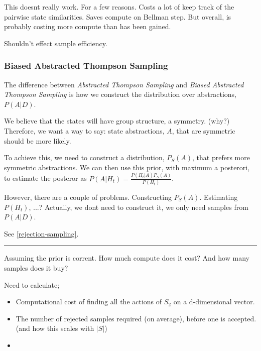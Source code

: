 
This doesnt really work. For a few reasons. Costs a lot of keep track of the pairwise state similarities.
Saves compute on Bellman step.
But overall, is probably costing more compute than has been gained.

Shouldn't effect sample efficiency.

\subsubsection{Biased Abstracted Thompson Sampling}

The difference between \textit{Abstracted Thompson Sampling} and \textit{Biased Abstracted Thompson Sampling}
is how we construct the distribution over abstractions, $P(A|D)$.

We believe that the states will have group structure, a symmetry. ({\color{red}why?})
Therefore, we want a way to say: state abstractions, $A$, that are symmetric should be more likely.

To achieve this, we need to construct a distribution, $P_S(A)$, that prefers more symmetric abstractions.
We can then use this prior, with maximum a posterori, to estimate the posteror as $P(A | H_t) = \frac{P(H_t | A)P_S(A)}{P(H_t)}$.

However, there are a couple of problems. Constructing $P_S(A)$. Estimating $P(H_t)$, ...?
Actually, we dont need to construct it, we only need samples from $P(A | D)$.

See \ref{rejection-sampling}.

\begin{center}\rule{0.5\linewidth}{\linethickness}\end{center}

Assuming the prior is corrent. How much compute does it cost? And how many samples does it buy?

Need to calculate;

\begin{itemize}
	\item Computational cost of finding all the actions of $S_2$ on a d-dimensional vector.
	\item The number of rejected samples required (on average), before one is accepted. (and how this scales with $|S|$)
	\item
\end{itemize}

